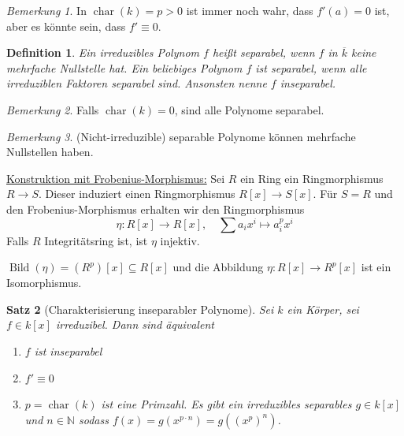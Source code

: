 \documentclass[a4paper,12pt,numbers=noenddot,parskip=full]{scrartcl}
\newcommand{\setN}{\mathbb{N}}
\newcommand{\heading}{\underline}
\theoremstyle{dotless}
\newtheorem{theorem}{Satz}[section]
\newtheorem{definition}[theorem]{Definition}
\theoremstyle{remark}
\newtheorem*{remark}{Bemerkung}
\begin{document}
	\begin{remark}
		In $\operatorname{char}(k) = p > 0$ ist immer noch wahr, dass $f'(a) = 0$ ist, aber es könnte sein, dass $f' \equiv 0$.
	\end{remark}

	\begin{definition}
		Ein irreduzibles Polynom $f$ heißt separabel, wenn $f$ in $\overline{k}$ keine mehrfache Nullstelle hat. Ein beliebiges Polynom $f$ ist separabel, wenn alle irreduziblen Faktoren separabel sind. Ansonsten nenne $f$ inseparabel.
	\end{definition}

	\begin{remark}
		Falls $\operatorname{char}(k) = 0$, sind alle Polynome separabel.
	\end{remark}

	\begin{remark}
		(Nicht-irreduzible) separable Polynome können mehrfache Nullstellen haben.
	\end{remark}

	\heading{Konstruktion mit Frobenius-Morphismus:} Sei $R$ ein Ring ein Ringmorphismus $R \to S$. Dieser induziert einen Ringmorphismus $R[x] \to S[x]$. Für $S = R$ und den Frobenius-Morphismus erhalten wir den Ringmorphismus
	\begin{equation*}
		\eta: R[x] \to R[x], \quad \sum a_i x^i \mapsto a_i^p x^i
	\end{equation*}
	Falls $R$ Integritätsring ist, ist $\eta$ injektiv.
	
	$\operatorname{Bild}(\eta) = (R^p)[x] \subseteq R[x]$ und die Abbildung $\eta: R[x] \to R^p[x]$ ist ein Isomorphismus.
	
	\begin{theorem}[Charakterisierung inseparabler Polynome]
		Sei $k$ ein Körper, sei $f \in k[x]$ irreduzibel. Dann sind äquivalent
		\begin{enumerate}
			\item $f$ ist inseparabel
			\item $f' \equiv 0$
			\item $p = \operatorname{char}(k)$ ist eine Primzahl. Es gibt ein irreduzibles separables $g \in k[x]$ und $n \in \setN$ sodass $f(x) = g(x^{p \cdot n}) = g((x^p)^n)$.
		\end{enumerate}
	\end{theorem}
\end{document}
